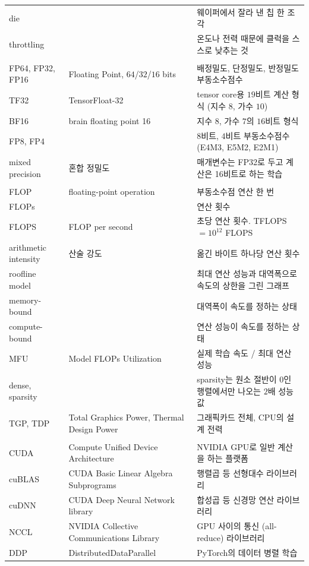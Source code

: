 \documentclass[11pt,a4paper]{article}
\begin{document}
{\begin{longtable}{@{}>{\raggedright\arraybackslash}p{24mm}>{\raggedright\arraybackslash}p{50mm}>{\raggedright\arraybackslash}p{76mm}@{}}
die & & 웨이퍼에서 잘라 낸 칩 한 조각 \\
throttling & & 온도나 전력 때문에 클럭을 스스로 낮추는 것 \\
\multicolumn{3}{@{}l}{\textbf{숫자 형식}} \\
FP64, FP32, FP16 & Floating Point, $64$/$32$/$16$ bits & 배정밀도, 단정밀도, 반정밀도 부동소수점수 \\
TF32 & TensorFloat-32 & tensor core용 $19$비트 계산 형식 (지수 $8$, 가수 $10$) \\
BF16 & brain floating point 16 & 지수 $8$, 가수 $7$의 $16$비트 형식 \\
FP8, FP4 & & $8$비트, $4$비트 부동소수점수 (E4M3, E5M2, E2M1) \\
mixed precision & 혼합 정밀도 & 매개변수는 FP32로 두고 계산은 16비트로 하는 학습 \\
\multicolumn{3}{@{}l}{\textbf{성능}} \\
FLOP & floating-point operation & 부동소수점 연산 한 번 \\
FLOPs & & 연산 횟수 \\
FLOPS & FLOP per second & 초당 연산 횟수. TFLOPS $=10^{12}$ FLOPS \\
arithmetic intensity & 산술 강도 & 옮긴 바이트 하나당 연산 횟수 \\
roofline model & & 최대 연산 성능과 대역폭으로 속도의 상한을 그린 그래프 \\
memory-bound & & 대역폭이 속도를 정하는 상태 \\
compute-bound & & 연산 성능이 속도를 정하는 상태 \\
MFU & Model FLOPs Utilization & 실제 학습 속도 / 최대 연산 성능 \\
dense, sparsity & & sparsity는 원소 절반이 $0$인 행렬에서만 나오는 $2$배 성능 값 \\
TGP, TDP & Total Graphics Power, Thermal Design Power & 그래픽카드 전체, CPU의 설계 전력 \\
\multicolumn{3}{@{}l}{\textbf{소프트웨어}} \\
CUDA & Compute Unified Device Architecture & NVIDIA GPU로 일반 계산을 하는 플랫폼 \\
cuBLAS & CUDA Basic Linear Algebra Subprograms & 행렬곱 등 선형대수 라이브러리 \\
cuDNN & CUDA Deep Neural Network library & 합성곱 등 신경망 연산 라이브러리 \\
NCCL & NVIDIA Collective Communications Library & GPU 사이의 통신 (all-reduce) 라이브러리 \\
DDP & DistributedDataParallel & PyTorch의 데이터 병렬 학습 \\

\end{longtable}}
\end{document}

